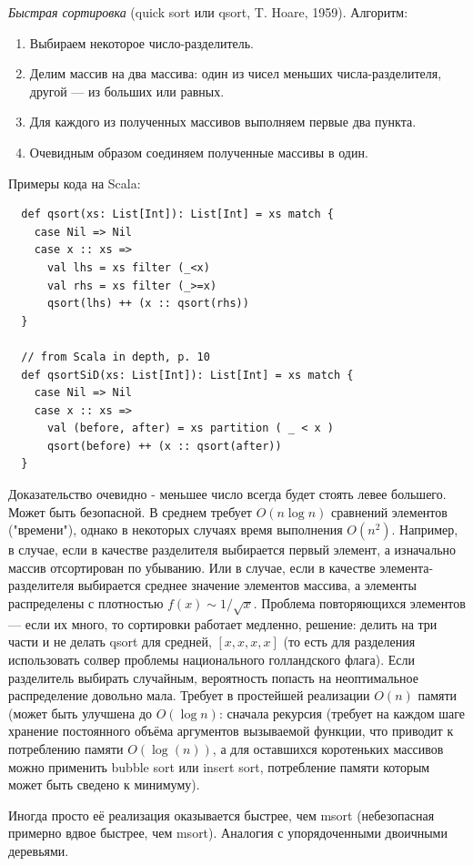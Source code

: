 \documentclass{book}
\begin{document}
\textit{Быстрая сортировка} (quick sort или qsort, T. Hoare, 1959). Алгоритм:
\begin{enumerate}
  \item Выбираем некоторое число-разделитель.
  \item Делим массив на два массива: один из чисел меньших числа-разделителя,
    другой --- из больших или равных.
  \item Для каждого из полученных массивов выполняем первые два пункта.
  \item Очевидным образом соединяем полученные массивы в один.
\end{enumerate}
Примеры кода на Scala:
\begin{verbatim}
  def qsort(xs: List[Int]): List[Int] = xs match {
    case Nil => Nil
    case x :: xs =>
      val lhs = xs filter (_<x)
      val rhs = xs filter (_>=x)
      qsort(lhs) ++ (x :: qsort(rhs))
  }

  // from Scala in depth, p. 10
  def qsortSiD(xs: List[Int]): List[Int] = xs match {
    case Nil => Nil
    case x :: xs =>
      val (before, after) = xs partition ( _ < x )
      qsort(before) ++ (x :: qsort(after))
  }
\end{verbatim}
Доказательство очевидно - меньшее число всегда будет стоять левее большего.  Может быть безопасной.
В среднем требует $O(n\log n)$ сравнений элементов ("времени"), однако в некоторых случаях время
выполнения $O(n^2)$. Например, в случае, если в качестве разделителя выбирается первый элемент, а
изначально массив отсортирован по убыванию. Или в случае, если в качестве элемента-разделителя
выбирается среднее значение элементов массива, а элементы распределены с плотностью $f(x) \sim 1 /
\sqrt{x}$. Проблема повторяющихся элементов --- если их много, то сортировки работает медленно,
решение: делить на три части и не делать qsort для
средней, $[x,x,x,x]$ (то есть для разделения использовать солвер проблемы национального
голландского флага). Если разделитель выбирать случайным, вероятность попасть на неоптимальное
распределение довольно мала. Требует в простейшей реализации $O(n)$ памяти (может быть улучшена до
$O(\log n)$: сначала рекурсия (требует на каждом шаге хранение постоянного объёма аргументов
вызываемой функции, что приводит к потреблению памяти $O(\log(n))$, а для оставшихся коротеньких
массивов можно применить bubble sort или insert sort, потребление памяти которым может быть сведено
к минимуму).

Иногда просто её реализация оказывается
быстрее, чем msort (небезопасная примерно вдвое быстрее, чем msort). Аналогия с упорядоченными
двоичными деревьями.
\end{document}
